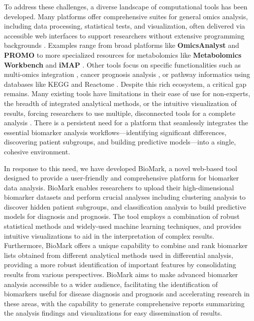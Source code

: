 \documentclass[journal]{IEEEtran}
\begin{document}
To address these challenges, a diverse landscape of computational tools has been developed. Many platforms offer comprehensive suites for general omics analysis, including data processing, statistical tests, and visualization, often delivered via accessible web interfaces to support researchers without extensive programming backgrounds \cite{Akhmedov2020_OmicsPlayground, Gruca2022_MAINE, Lu2024_GenoCraft, MetaboAnalyst_2009, WebSpecmine_2019}. Examples range from broad platforms like \textbf{OmicsAnalyst} \cite{OmicsAnalyst_2021} and \textbf{PROMO} \cite{Netanely2019_PROMO} to more specialized resources for metabolomics like \textbf{Metabolomics Workbench} \cite{MetabolomicsWorkbench_2016} and \textbf{iMAP} \cite{iMAP_2021}. Other tools focus on specific functionalities such as multi-omics integration \cite{MOMIC_2022}, cancer prognosis analysis \cite{Zheng2020_CancerReview, OSacc_2019}, or pathway informatics using databases like KEGG \cite{KEGG_2017} and Reactome \cite{Reactome_2020}. Despite this rich ecosystem, a critical gap remains. Many existing tools have limitations in their ease of use for non-experts, the breadth of integrated analytical methods, or the intuitive visualization of results, forcing researchers to use multiple, disconnected tools for a complete analysis \cite{exploRase_2006, XCMSOnline_2012}. There is a persistent need for a platform that seamlessly integrates the essential biomarker analysis workflows—identifying significant differences, discovering patient subgroups, and building predictive models—into a single, cohesive environment.

In response to this need, we have developed BioMark, a novel web-based tool designed to provide a user-friendly and comprehensive platform for biomarker data analysis. BioMark enables researchers to upload their high-dimensional biomarker datasets and perform crucial analyses including clustering analysis to discover hidden patient subgroups, and classification analysis to build predictive models for diagnosis and prognosis. The tool employs a combination of robust statistical methods and widely-used machine learning techniques, and provides intuitive visualizations to aid in the interpretation of complex results. Furthermore, BioMark offers a unique capability to combine and rank biomarker lists obtained from different analytical methods used in differential analysis, providing a more robust identification of important features by consolidating results from various perspectives. BioMark aims to make advanced biomarker analysis accessible to a wider audience, facilitating the identification of biomarkers useful for disease diagnosis and prognosis and accelerating research in these areas, with the capability to generate comprehensive reports summarizing the analysis findings and visualizations for easy dissemination of results.
\end{document}
